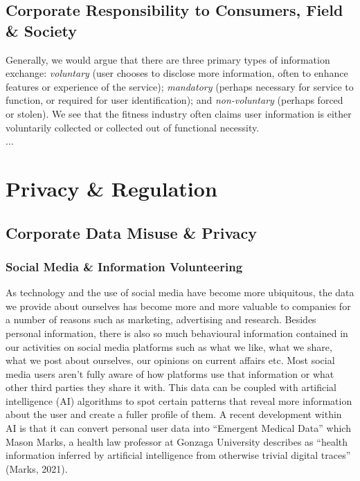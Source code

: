 \documentclass[11pt, english]{article}
\begin{document}
	\subsection{Corporate Responsibility to Consumers, Field \& Society}

	Generally, we would argue that there are three primary types of information exchange: \textit{voluntary} (user chooses to disclose more information, often to enhance features or experience of the service); \textit{mandatory} (perhaps necessary for service to function, or required for user identification); and \textit{non-voluntary} (perhaps forced or stolen). We see that the fitness industry often claims user information is either voluntarily collected or collected out of functional necessity.\\

	...

\newpage

\section{Privacy \& Regulation}

	\subsection{Corporate Data Misuse \& Privacy}

		\subsubsection{Social Media \& Information Volunteering}
	
	As technology and the use of social media have become more ubiquitous, the data we provide about ourselves has become more and more valuable to companies for a number of reasons such as marketing, advertising and research. Besides personal information, there is also so much behavioural information contained in our activities on social media platforms such as what we like, what we share, what we post about ourselves, our opinions on current affairs etc. Most social media users aren't fully aware of how platforms use that information or what other third parties they share it with. This data can be coupled with artificial intelligence (AI) algorithms to spot certain patterns that reveal more information about the user and create a fuller profile of them. A recent development within AI is that it can convert personal user data into ``Emergent Medical Data'' which Mason Marks, a health law professor at Gonzaga University describes as ``health information inferred by artificial intelligence from otherwise trivial digital traces'' (Marks, 2021).\\
\end{document}
